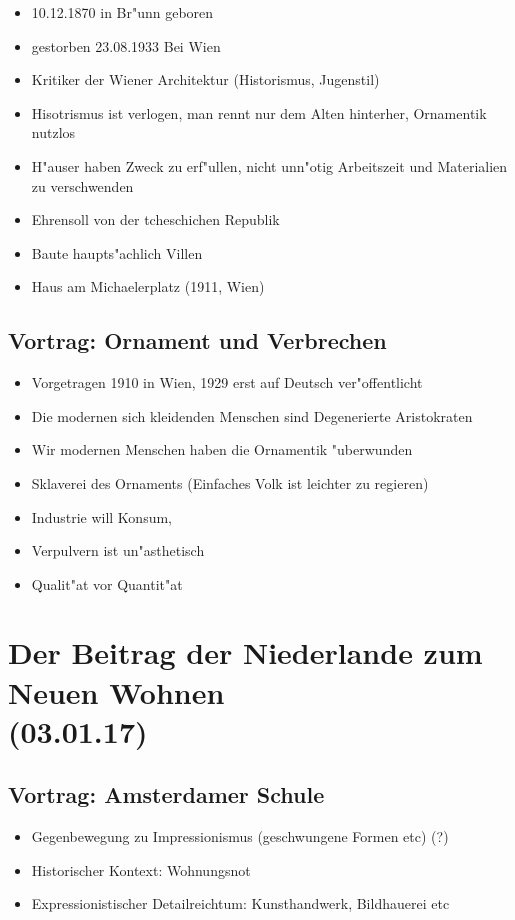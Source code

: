 \documentclass[a5paper]{scrartcl}
\begin{document}
\begin{itemize}
  \item 10.12.1870 in Br"unn geboren
  \item gestorben 23.08.1933 Bei Wien
  \item Kritiker der Wiener Architektur (Historismus, Jugenstil)
  \item Hisotrismus ist verlogen, man rennt nur dem Alten hinterher, Ornamentik nutzlos
  \item H"auser haben Zweck zu erf"ullen, nicht unn"otig Arbeitszeit und Materialien zu verschwenden
  \item Ehrensoll von der tcheschichen Republik
  \item Baute haupts"achlich Villen
  \item Haus am Michaelerplatz (1911, Wien)
\end{itemize}


\subsection{Vortrag: Ornament und Verbrechen}

\begin{itemize}
  \item Vorgetragen 1910 in Wien, 1929 erst auf Deutsch ver"offentlicht
  \item Die modernen sich kleidenden Menschen sind Degenerierte Aristokraten
  \item Wir modernen Menschen haben die Ornamentik "uberwunden
  \item Sklaverei des Ornaments (Einfaches Volk ist leichter zu regieren)
  \item Industrie will Konsum, 
  \item Verpulvern ist un"asthetisch
  \item Qualit"at vor Quantit"at
\end{itemize}


\section{Der Beitrag der Niederlande zum Neuen Wohnen\\(03.01.17)}


\subsection{Vortrag: Amsterdamer Schule}

\begin{itemize}
  \item Gegenbewegung zu Impressionismus (geschwungene Formen etc) (?)
  \item Historischer Kontext: Wohnungsnot
  \item Expressionistischer Detailreichtum: Kunsthandwerk, Bildhauerei etc
\end{itemize}
\end{document}

